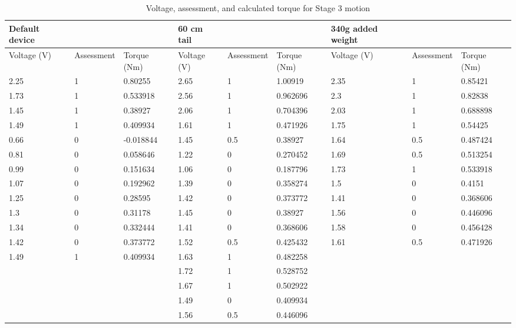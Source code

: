 \begin{landscape}
\begin{table}[!ht]
	\centering
	\caption{Voltage, assessment, and calculated torque for Stage 3 motion}
	\footnotesize
	\begin{tabular}{|l|l|l|l|l|l|l|l|l|}
		\hline
		Default device & ~ & ~ & 60 cm tail & ~ & ~ & 340g added weight & ~ & ~ \\ \hline
		Voltage (V) & Assessment & Torque (Nm) & Voltage (V) & Assessment & Torque (Nm) & Voltage (V) & Assessment & Torque (Nm) \\ \hline
		2.25 & 1 & 0.80255 & 2.65 & 1 & 1.00919 & 2.35 & 1 & 0.85421 \\ \hline
		1.73 & 1 & 0.533918 & 2.56 & 1 & 0.962696 & 2.3 & 1 & 0.82838 \\ \hline
		1.45 & 1 & 0.38927 & 2.06 & 1 & 0.704396 & 2.03 & 1 & 0.688898 \\ \hline
		1.49 & 1 & 0.409934 & 1.61 & 1 & 0.471926 & 1.75 & 1 & 0.54425 \\ \hline
		0.66 & 0 & -0.018844 & 1.45 & 0.5 & 0.38927 & 1.64 & 0.5 & 0.487424 \\ \hline
		0.81 & 0 & 0.058646 & 1.22 & 0 & 0.270452 & 1.69 & 0.5 & 0.513254 \\ \hline
		0.99 & 0 & 0.151634 & 1.06 & 0 & 0.187796 & 1.73 & 1 & 0.533918 \\ \hline
		1.07 & 0 & 0.192962 & 1.39 & 0 & 0.358274 & 1.5 & 0 & 0.4151 \\ \hline
		1.25 & 0 & 0.28595 & 1.42 & 0 & 0.373772 & 1.41 & 0 & 0.368606 \\ \hline
		1.3 & 0 & 0.31178 & 1.45 & 0 & 0.38927 & 1.56 & 0 & 0.446096 \\ \hline
		1.34 & 0 & 0.332444 & 1.41 & 0 & 0.368606 & 1.58 & 0 & 0.456428 \\ \hline
		1.42 & 0 & 0.373772 & 1.52 & 0.5 & 0.425432 & 1.61 & 0.5 & 0.471926 \\ \hline
		1.49 & 1 & 0.409934 & 1.63 & 1 & 0.482258 & ~ & ~ & ~ \\ \hline
		~ & ~ & ~ & 1.72 & 1 & 0.528752 & ~ & ~ & ~ \\ \hline
		~ & ~ & ~ & 1.67 & 1 & 0.502922 & ~ & ~ & ~ \\ \hline
		~ & ~ & ~ & 1.49 & 0 & 0.409934 & ~ & ~ & ~ \\ \hline
		~ & ~ & ~ & 1.56 & 0.5 & 0.446096 & ~ & ~ & ~ \\ \hline
	\end{tabular}
\end{table}


\end{landscape}

